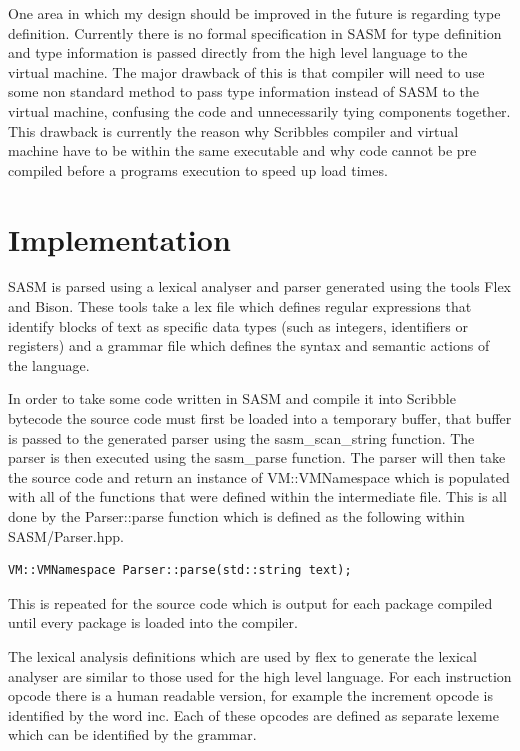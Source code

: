 \documentclass[]{final_report}
\begin{document}
One area in which my design should be improved in the future is regarding type definition. Currently there is no formal specification in SASM for type definition and type information is passed directly from the high level language to the virtual machine. The major drawback of this is that compiler will need to use some non standard method to pass type information instead of SASM to the virtual machine, confusing the code and unnecessarily tying components together. This drawback is currently the reason why Scribbles compiler and virtual machine have to be within the same executable and why code cannot be pre compiled before a programs execution to speed up load times.

\section{Implementation}

SASM is parsed using a lexical analyser and parser generated using the tools Flex and Bison. These tools take a lex file which defines regular expressions that identify blocks of text as specific data types (such as integers, identifiers or registers) and a grammar file which defines the syntax and semantic actions of the language.

In order to take some code written in SASM and compile it into Scribble bytecode the source code must first be loaded into a temporary buffer, that buffer is passed to the generated parser using the sasm\_scan\_string function. The parser is then executed using the sasm\_parse function. The parser will then take the source code and return an instance of VM::VMNamespace which is populated with all of the functions that were defined within the intermediate file. This is all done by the Parser::parse function which is defined as the following within SASM/Parser.hpp.

\begin{verbatim}
VM::VMNamespace Parser::parse(std::string text);
\end{verbatim}

This is repeated for the source code which is output for each package compiled until every package is loaded into the compiler.

The lexical analysis definitions which are used by flex to generate the lexical analyser are similar to those used for the high level language. For each instruction opcode there is a human readable version, for example the increment opcode is identified by the word inc. Each of these opcodes are defined as separate lexeme which can be identified by the grammar.
\end{document}
